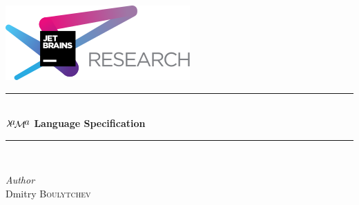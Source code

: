 \documentclass{book}
\newcommand{\lama}{$\lambda\kern -.1667em\lower -.5ex\hbox{$a$}\kern -.1000em\lower .2ex\hbox{$\mathcal M$}\kern -.1000em\lower -.5ex\hbox{$a$}$\xspace}
\begin{document}
\begin{titlepage} %
	\newcommand{\HRule}{\rule{\linewidth}{0.5mm}} %
	
	\center %
	

	\includegraphics[scale=0.5]{jetbrains.png}\\[3cm]
	
	
	
	
	\HRule\\[0.4cm]
	
	{\huge\bfseries \lama Language Specification}\\[0.4cm] %
	
	\HRule\\[1.5cm]
	
	
	\begin{minipage}{0.4\textwidth}
		\begin{flushleft}
			\large
			\textit{Author}\\
			Dmitry \textsc{Boulytchev} %
		\end{flushleft}
	\end{minipage}
	

\end{titlepage}
\end{document}
